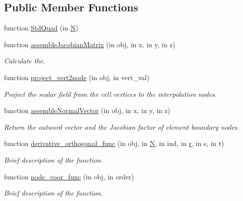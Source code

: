 \subsection*{Public Member Functions}
\begin{DoxyCompactItemize}
\item 
function \hyperlink{class_std_quad_a349638d7663237d8db05c36b3e26da38}{Std\+Quad} (in \hyperlink{class_std_cell_a8df35ad5169af36d3dff62644f7878c9}{N})
\item 
function \hyperlink{class_std_quad_aa7ee70b0fd45810269b4c29fac7aa122}{assemble\+Jacobian\+Matrix} (in obj, in x, in y, in z)
\begin{DoxyCompactList}\small\item\em Calculate the. \end{DoxyCompactList}\item 
function \hyperlink{class_std_quad_a5c4063045205f6d22d7ed9755a892323}{project\+\_\+vert2node} (in obj, in vert\+\_\+val)
\begin{DoxyCompactList}\small\item\em Project the scalar field from the cell vertices to the interpolation nodes. \end{DoxyCompactList}\item 
function \hyperlink{class_std_quad_a911d8c7bcf672f0e4d3018bfdb2f72e9}{assemble\+Normal\+Vector} (in obj, in x, in y, in z)
\begin{DoxyCompactList}\small\item\em Return the outword vector and the Jacobian factor of element boundary nodes. \end{DoxyCompactList}\item 
function \hyperlink{class_std_quad_ab8c3fc33d46286634afb9d78a1635ff9}{derivative\+\_\+orthogonal\+\_\+func} (in obj, in \hyperlink{class_std_cell_a8df35ad5169af36d3dff62644f7878c9}{N}, in ind, in \hyperlink{class_std_cell_a737dd2feb25f74be0215a594334ec622}{r}, in s, in t)
\begin{DoxyCompactList}\small\item\em Brief description of the function. \end{DoxyCompactList}\item 
function \hyperlink{class_std_quad_a4a41ca6368668b31520d1caea903e655}{node\+\_\+coor\+\_\+func} (in obj, in order)
\begin{DoxyCompactList}\small\item\em Brief description of the function. \end{DoxyCompactList}\item 

\end{DoxyCompactItemize}
